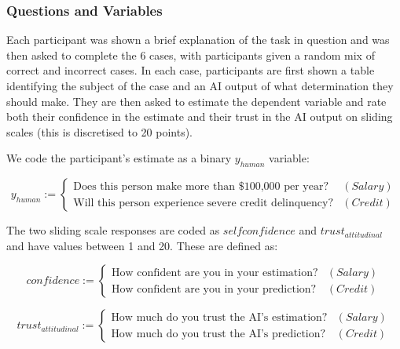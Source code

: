 
\subsubsection{Questions and Variables}\label{sssec:q_and_v}
Each participant was shown a brief explanation of the task in question and was then asked to complete the 6 cases, with participants given a random mix of correct and incorrect cases. In each case, participants are first shown a table identifying the subject of the case and an AI output of what determination they should make. They are then asked to estimate the dependent variable and rate both their confidence in the estimate and their trust in the AI output on sliding scales (this is discretised to 20 points).

We code the participant's estimate as a binary $y_{human}$ variable:

\begin{equation}
    y_{human} := \begin{cases}
        \text{Does this person make more than \$100,000 per year?} & (Salary) \\
        \text{Will this person experience severe credit delinquency?} & (Credit)
    \end{cases}
\end{equation}

\noindent The two sliding scale responses are coded as $selfconfidence$ and $trust_{attitudinal}$ and have values between 1 and 20. These are defined as:

\begin{equation}
    confidence := \begin{cases}
        \text{How confident are you in your estimation?} & (Salary) \\
        \text{How confident are you in your prediction?} & (Credit)
    \end{cases}
\end{equation}

\begin{equation}
    trust_{attitudinal} := \begin{cases}
        \text{How much do you trust the AI's estimation?} & (Salary) \\
        \text{How much do you trust the AI's prediction?} & (Credit)
    \end{cases}
\end{equation}

